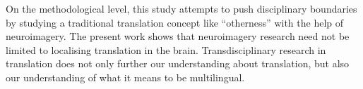 \documentclass[output=paper]{LSP/langsci}
\begin{document}
On the methodological level, this study attempts to push disciplinary boundaries by studying a traditional translation concept like ``otherness'' with the help of neuroimagery. The present work shows that neuroimagery research need not be limited to localising translation in the brain. Transdisciplinary research in translation does not only further our understanding about translation, but also our understanding of what it means to be multilingual. 

\sloppy
\printbibliography[heading=subbibliography,notkeyword=this]
\end{document}
